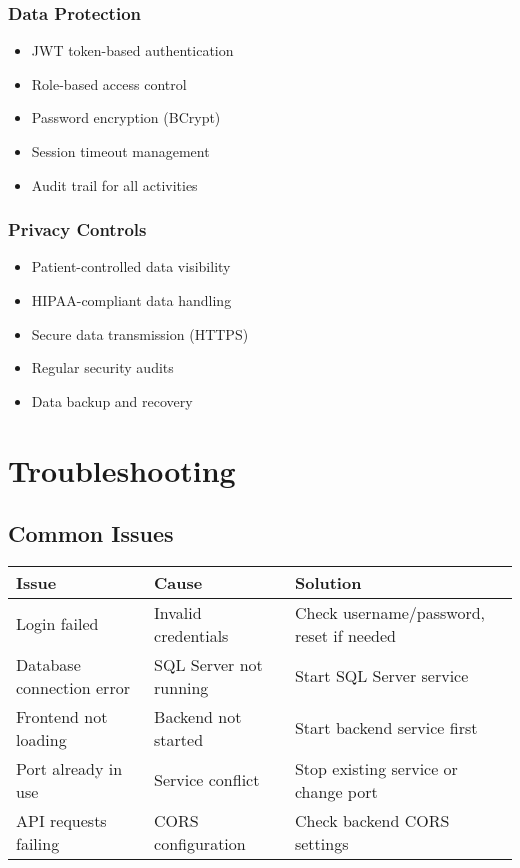 \documentclass[12pt,a4paper]{article}
\begin{document}
\subsubsection{Data Protection}

\begin{itemize}
    \item JWT token-based authentication
    \item Role-based access control
    \item Password encryption (BCrypt)
    \item Session timeout management
    \item Audit trail for all activities
\end{itemize}

\subsubsection{Privacy Controls}

\begin{itemize}
    \item Patient-controlled data visibility
    \item HIPAA-compliant data handling
    \item Secure data transmission (HTTPS)
    \item Regular security audits
    \item Data backup and recovery
\end{itemize}

\section{Troubleshooting}

\subsection{Common Issues}

\begin{longtable}{|p{4cm}|p{5cm}|p{5cm}|}
\hline
\textbf{Issue} & \textbf{Cause} & \textbf{Solution} \\
\hline
Login failed & Invalid credentials & Check username/password, reset if needed \\
\hline
Database connection error & SQL Server not running & Start SQL Server service \\
\hline
Frontend not loading & Backend not started & Start backend service first \\
\hline
Port already in use & Service conflict & Stop existing service or change port \\
\hline
API requests failing & CORS configuration & Check backend CORS settings \\
\hline
\end{longtable}
\end{document}
